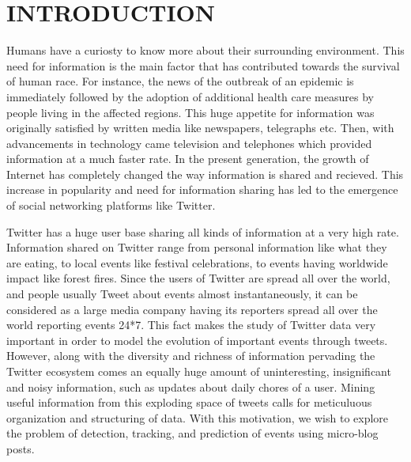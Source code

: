\section{\uppercase{Introduction}}
Humans have a curiosty to know more about their surrounding environment. This need for information is the main factor that has contributed towards the survival of human race. For instance, the news of the outbreak of an epidemic is immediately followed by the adoption of additional health care measures by people living in the affected regions. This huge appetite for information was originally satisfied by written media like newspapers, telegraphs etc. Then, with advancements in technology came television and telephones which provided information at a much faster rate. In the present generation, the growth of Internet has completely changed the way information is shared and recieved. This increase in popularity and need for information sharing has led to the emergence of social networking platforms like Twitter.

Twitter has a huge user base sharing all kinds of information at a very high rate. Information shared on Twitter range from personal information like what they are eating, to local events like festival celebrations, to events having worldwide impact like forest fires. Since the users of Twitter are spread all over the world, and people usually Tweet about events almost instantaneously, it can be considered as a large media company having its reporters spread all over the world reporting events 24*7. This fact makes the study of Twitter data very important in order to model the evolution of important events through tweets. However, along with the diversity and richness of information pervading the Twitter ecosystem comes an equally huge amount of uninteresting, insignificant and noisy information, such as updates about daily chores of a user. Mining useful information from this exploding space of tweets calls for meticuluous organization and structuring of data. With this motivation, we wish to explore the problem of detection, tracking, and prediction of events using micro-blog posts.